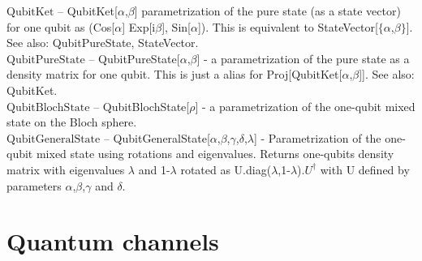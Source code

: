 \documentclass[a4paper,10pt]{scrartcl}
\begin{document}
\noindent\textbf{$ \text{QubitKet} $ }-- QubitKet[$\alpha $,$\beta $] parametrization of the pure state (as a state vector) for one qubit as (Cos[$\alpha $] Exp[i$\beta $], Sin[$\alpha $]). This is equivalent to StateVector[$\{\alpha $,$\beta \}$]. See also: QubitPureState, StateVector.$  $\\[8pt]
\noindent\textbf{$ \text{QubitPureState} $ }-- QubitPureState[$\alpha $,$\beta $] - a parametrization of the pure state as a density matrix for one qubit. This is just a alias for Proj[QubitKet[$\alpha $,$\beta $]]. See also: QubitKet.$  $\\[8pt]
\noindent\textbf{$ \text{QubitBlochState} $ }-- QubitBlochState[$\rho $] - a parametrization of the one-qubit mixed state on the Bloch sphere.$  $\\[8pt]
\noindent\textbf{$ \text{QubitGeneralState} $ }-- QubitGeneralState[$\alpha $,$\beta $,$\gamma $,$\delta $,$\lambda $] - Parametrization of the one-qubit mixed state using rotations and eigenvalues. Returns one-qubits density matrix with eigenvalues $\lambda $ and 1-$\lambda $ rotated as U.diag($\lambda $,1-$\lambda $).$ U^{\dagger } $ with U defined by parameters $\alpha $,$\beta $,$\gamma $ and $\delta $.$  $\\[8pt]
\section{Quantum channels}
\end{document}
